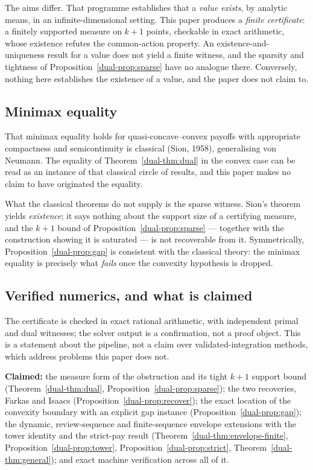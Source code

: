\documentclass[10pt,twocolumn]{article}
\theoremstyle{plain}
\theoremstyle{definition}
\theoremstyle{remark}
\begin{document}
The aims differ. That programme establishes that a \emph{value exists}, by analytic means, in
an infinite-dimensional setting. This paper produces a \emph{finite certificate}: a
finitely supported measure on $k+1$ points, checkable in exact arithmetic, whose existence
refutes the common-action property. An existence-and-uniqueness result for a value does not
yield a finite witness, and the sparsity and tightness of
Proposition~\ref{dual-prop:sparse} have no analogue there. Conversely, nothing here establishes
the existence of a value, and the paper does not claim to.

\subsection{Minimax equality}

That minimax equality holds for quasi-concave--convex payoffs with appropriate compactness
and semicontinuity is classical (Sion, 1958), generalising von Neumann. The equality of
Theorem~\ref{dual-thm:dual} in the convex case can be read as an instance of that classical
circle of results, and this paper makes no claim to have originated the equality.

What the classical theorems do not supply is the sparse witness. Sion's theorem yields
\emph{existence}; it says nothing about the support size of a certifying measure, and the
$k+1$ bound of Proposition~\ref{dual-prop:sparse} --- together with the construction showing it is
saturated --- is not recoverable from it. Symmetrically, Proposition~\ref{dual-prop:gap} is
consistent with the classical theory: the minimax equality is precisely what
\emph{fails} once the convexity hypothesis is dropped.

\subsection{Verified numerics, and what is claimed}

The certificate is checked in exact rational arithmetic, with independent primal and dual
witnesses; the solver output is a confirmation, not a proof object. This is a statement about
the pipeline, not a claim over validated-integration methods, which address problems this
paper does not.

\medskip

\noindent \textbf{Claimed:} the measure form of the obstruction and its tight $k+1$ support
bound (Theorem~\ref{dual-thm:dual}, Proposition~\ref{dual-prop:sparse}); the two recoveries, Farkas and
Isaacs (Proposition~\ref{dual-prop:recover}); the exact location of the convexity boundary with an
explicit gap instance (Proposition~\ref{dual-prop:gap}); the dynamic, review-sequence and
finite-sequence envelope extensions with the tower identity and the strict-pay result
(Theorem~\ref{dual-thm:envelope-finite}, Proposition~\ref{dual-prop:tower},
Proposition~\ref{dual-prop:strict}, Theorem~\ref{dual-thm:general}); and exact machine verification
across all of it.
\end{document}
